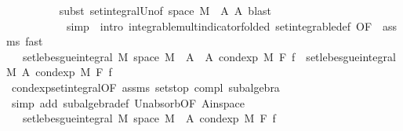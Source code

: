 \begin{isabellebody}
\ \ \ \ \ \ \ \ \isamarkupfalse%
\ {\isacharparenleft}{\kern0pt}subst\ set{\isacharunderscore}{\kern0pt}integral{\isacharunderscore}{\kern0pt}Un{\isacharbrackleft}{\kern0pt}of\ {\isachardoublequoteopen}space\ M\ {\isacharminus}{\kern0pt}\ A{\isachardoublequoteclose}\ A{\isacharbrackright}{\kern0pt}{\isacharcomma}{\kern0pt}\ blast{\isacharparenright}{\kern0pt}\isanewline
\ \ \ \ \ \ \ \ \ \ \ {\isacharparenleft}{\kern0pt}simp\ {\isacharbar}{\kern0pt}\ intro\ integrable{\isacharunderscore}{\kern0pt}mult{\isacharunderscore}{\kern0pt}indicator{\isacharbrackleft}{\kern0pt}folded\ set{\isacharunderscore}{\kern0pt}integrable{\isacharunderscore}{\kern0pt}def{\isacharcomma}{\kern0pt}\ OF\ {\isacharunderscore}{\kern0pt}\ assms{\isacharparenleft}{\kern0pt}{}{\isacharparenright}{\kern0pt}{\isacharbrackright}{\kern0pt}{\isacharcomma}{\kern0pt}\ fast{\isacharparenright}{\kern0pt}{\isacharplus}{\kern0pt}\isanewline
\ \ \ \ \ \ \isamarkupfalse%
\ \isamarkupfalse%
\ {\isachardoublequoteopen}{\isachardot}{\kern0pt}{\isachardot}{\kern0pt}{\isachardot}{\kern0pt}\ {\isacharequal}{\kern0pt}\ set{\isacharunderscore}{\kern0pt}lebesgue{\isacharunderscore}{\kern0pt}integral\ M\ {\isacharparenleft}{\kern0pt}space\ M\ {\isacharminus}{\kern0pt}\ A\ {\isasymunion}\ A{\isacharparenright}{\kern0pt}\ {\isacharparenleft}{\kern0pt}cond{\isacharunderscore}{\kern0pt}exp\ M\ F\ f{\isacharparenright}{\kern0pt}\ {\isacharminus}{\kern0pt}\ set{\isacharunderscore}{\kern0pt}lebesgue{\isacharunderscore}{\kern0pt}integral\ M\ A\ {\isacharparenleft}{\kern0pt}cond{\isacharunderscore}{\kern0pt}exp\ M\ F\ f{\isacharparenright}{\kern0pt}{\isachardoublequoteclose}\ \isanewline
\ \ \ \ \ \ \ \ \isamarkupfalse%
\ cond{\isacharunderscore}{\kern0pt}exp{\isacharunderscore}{\kern0pt}set{\isacharunderscore}{\kern0pt}integral{\isacharbrackleft}{\kern0pt}OF\ assms{\isacharparenleft}{\kern0pt}{}{\isacharparenright}{\kern0pt}\ sets{\isachardot}{\kern0pt}top{\isacharbrackright}{\kern0pt}\ compl\ subalgebra\ \isamarkupfalse%
\ {\isacharparenleft}{\kern0pt}simp\ add{\isacharcolon}{\kern0pt}\ subalgebra{\isacharunderscore}{\kern0pt}def\ Un{\isacharunderscore}{\kern0pt}absorb{}{\isacharbrackleft}{\kern0pt}OF\ A{\isacharunderscore}{\kern0pt}in{\isacharunderscore}{\kern0pt}space{\isacharbrackright}{\kern0pt}{\isacharparenright}{\kern0pt}\isanewline
\ \ \ \ \ \ \isamarkupfalse%
\ \isamarkupfalse%
\ {\isachardoublequoteopen}{\isachardot}{\kern0pt}{\isachardot}{\kern0pt}{\isachardot}{\kern0pt}\ {\isacharequal}{\kern0pt}\ set{\isacharunderscore}{\kern0pt}lebesgue{\isacharunderscore}{\kern0pt}integral\ M\ {\isacharparenleft}{\kern0pt}space\ M\ {\isacharminus}{\kern0pt}\ A{\isacharparenright}{\kern0pt}\ {\isacharparenleft}{\kern0pt}cond{\isacharunderscore}{\kern0pt}exp\ M\ F\ f{\isacharparenright}{\kern0pt}{\isachardoublequoteclose}\isanewline

\end{isabellebody}
